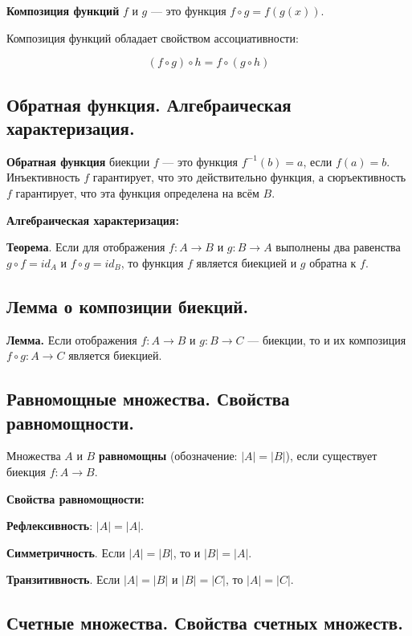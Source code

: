 \documentclass[a4paper, 10pt]{article}
\begin{document}
\textbf{Композиция функций} $f$ и $g$ --- это функция $f \circ g = f(g(x))$.

Композиция функций обладает свойством ассоциативности:

$$(f \circ g) \circ h = f \circ (g \circ h)$$


\subsection{Обратная функция. Алгебраическая характеризация.}

\textbf{Обратная функция} биекции $f$ --- это функция $f^{-1}(b)=a$, если $f(a)=b$. Инъективность $f$ гарантирует, что это действительно функция, а сюръективность $f$ гарантирует, что эта функция определена на всём $B$.

\vspace{2mm}

\textbf{Алгебраическая характеризация:}

\textbf{Теорема}. Если для отображения $f: A \to B$ и $g\colon B \to A$ выполнены два равенства $g \circ f = id_A$ и $f \circ g = id_B$, то функция $f$ является биекцией и $g$ обратна к $f$.


\subsection{Лемма о композиции биекций.}

\textbf{Лемма.} Если отображения $f \colon A \to B$ и $g \colon B \to C$ --- биекции, то и их композиция $f \circ g \colon A \to C$ является биекцией.


\subsection{Равномощные множества. Свойства равномощности.}

Множества $A$ и $B$ \textbf{равномощны} (обозначение: $|A|=|B|$), если существует биекция $f \colon A \to B$.

\vspace{2mm}

\textbf{Свойства равномощности:}

\textbf{Рефлексивность}: $|A|=|A|$. 

\textbf{Симметричность}. Если $|A|=|B|$, то и $|B|=|A|$. 

\textbf{Транзитивность}. Если $|A|=|B|$ и $|B|=|C|$, то $|A|=|C|$.


\subsection{Счетные множества. Свойства счетных множеств.}
\end{document}
